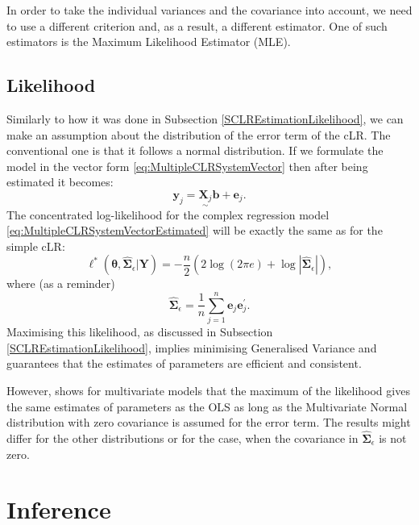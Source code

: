 \documentclass[
]{book}
\begin{document}
In order to take the individual variances and the covariance into account, we need to use a different criterion and, as a result, a different estimator. One of such estimators is the Maximum Likelihood Estimator (MLE).

\hypertarget{likelihood}{%
\subsection{Likelihood}\label{likelihood}}

Similarly to how it was done in Subsection \ref{SCLREstimationLikelihood}, we can make an assumption about the distribution of the error term of the cLR. The conventional one is that it follows a normal distribution. If we formulate the model in the vector form \eqref{eq:MultipleCLRSystemVector} then after being estimated it becomes:
\begin{equation}
    \mathbf{y}_j = \underset{\sim}{\mathbf{X}_j} \boldsymbol{b} + \boldsymbol{e}_j .
    \label{eq:MultipleCLRSystemVectorEstimated}
\end{equation}
The concentrated log-likelihood for the complex regression model \eqref{eq:MultipleCLRSystemVectorEstimated} will be exactly the same as for the simple cLR:
\begin{equation*}
    \ell^*(\boldsymbol{\theta}, \hat{\boldsymbol{\Sigma}}_\epsilon | \mathbf{Y}) = -\frac{n}{2} \left( 2 \log(2 \pi e) + \log | \hat{\boldsymbol{\Sigma}}_\epsilon | \right) ,
\end{equation*}
where (as a reminder)
\begin{equation*}
    \hat{\boldsymbol{\Sigma}}_\epsilon = \frac{1}{n} \sum_{j=1}^{n} \boldsymbol{e}_j \boldsymbol{e}_j^\prime .
\end{equation*}
Maximising this likelihood, as discussed in Subsection \ref{SCLREstimationLikelihood}, implies minimising Generalised Variance and guarantees that the estimates of parameters are efficient and consistent.

However, \citet{Lutkepohl2005} shows for multivariate models that the maximum of the likelihood gives the same estimates of parameters as the OLS as long as the Multivariate Normal distribution with zero covariance is assumed for the error term. The results might differ for the other distributions or for the case, when the covariance in \(\hat{\boldsymbol{\Sigma}}_\epsilon\) is not zero.

\hypertarget{MCLRInference}{%
\section{Inference}\label{MCLRInference}}
\end{document}
